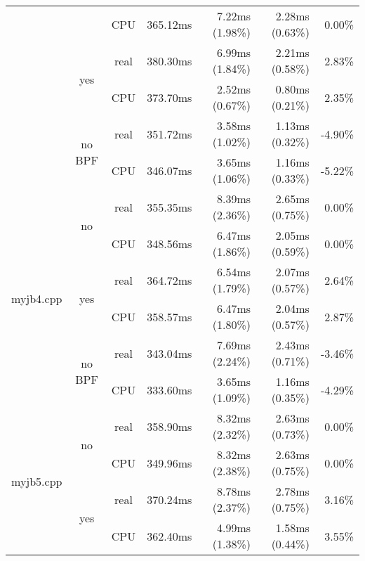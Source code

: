 \documentclass[en]{pracamgr}
\begin{document}
\begin{small}
\begin{longtable}{|l|c|c|r|r|r|r|}
                            &                         & CPU  & 365.12ms & 7.22ms (1.98\%) & 2.28ms (0.63\%) & 0.00\% \\*
                            \cline{2-7}
                            & \multirow{2}{*}{yes}    & real & 380.30ms & 6.99ms (1.84\%) & 2.21ms (0.58\%) & 2.83\% \\*
                            &                         & CPU  & 373.70ms & 2.52ms (0.67\%) & 0.80ms (0.21\%) & 2.35\% \\*
                            \cline{2-7}
                            & \multirow{2}{*}{no BPF} & real & 351.72ms & 3.58ms (1.02\%) & 1.13ms (0.32\%) & -4.90\% \\*
                            &                         & CPU  & 346.07ms & 3.65ms (1.06\%) & 1.16ms (0.33\%) & -5.22\% \\
\hline
\multirow{6}{*}{myjb4.cpp}  & \multirow{2}{*}{no}     & real & 355.35ms & 8.39ms (2.36\%) & 2.65ms (0.75\%) & 0.00\% \\*
                            &                         & CPU  & 348.56ms & 6.47ms (1.86\%) & 2.05ms (0.59\%) & 0.00\% \\*
                            \cline{2-7}
                            & \multirow{2}{*}{yes}    & real & 364.72ms & 6.54ms (1.79\%) & 2.07ms (0.57\%) & 2.64\% \\*
                            &                         & CPU  & 358.57ms & 6.47ms (1.80\%) & 2.04ms (0.57\%) & 2.87\% \\*
                            \cline{2-7}
                            & \multirow{2}{*}{no BPF} & real & 343.04ms & 7.69ms (2.24\%) & 2.43ms (0.71\%) & -3.46\% \\*
                            &                         & CPU  & 333.60ms & 3.65ms (1.09\%) & 1.16ms (0.35\%) & -4.29\% \\
\hline
\multirow{6}{*}{myjb5.cpp}  & \multirow{2}{*}{no}     & real & 358.90ms & 8.32ms (2.32\%) & 2.63ms (0.73\%) & 0.00\% \\*
                            &                         & CPU  & 349.96ms & 8.32ms (2.38\%) & 2.63ms (0.75\%) & 0.00\% \\*
                            \cline{2-7}
                            & \multirow{2}{*}{yes}    & real & 370.24ms & 8.78ms (2.37\%) & 2.78ms (0.75\%) & 3.16\% \\*
                            &                         & CPU  & 362.40ms & 4.99ms (1.38\%) & 1.58ms (0.44\%) & 3.55\% \\*

\end{longtable}
\end{small}
\end{document}

